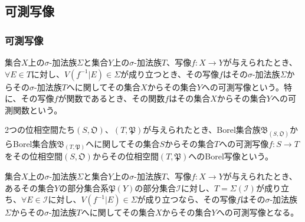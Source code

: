 \documentclass[dvipdfmx]{jsarticle}
\begin{document}
\subsection{可測写像}%
\subsubsection{可測写像}%
\begin{dfn}
集合$X$上の$\sigma$-加法族$\varSigma$と集合$Y$上の$\sigma$-加法族$T$、写像$f:X \rightarrow Y$が与えられたとき、$\forall E \in T$に対し、$V\left( f^{- 1}|E \right) \in \varSigma$が成り立つとき、その写像$f$はその$\sigma$-加法族$\varSigma$からその$\sigma$-加法族$T$へに関してその集合$X$からその集合$Y$への可測写像という。特に、その写像$f$が関数であるとき、その関数$f$はその集合$X$からその集合$Y$への可測関数という。
\end{dfn}
\begin{dfn}
2つの位相空間たち$\left( S,\mathfrak{O} \right)$、$\left( T,\mathfrak{P} \right)$が与えられたとき、Borel集合族$\mathfrak{B}_{\left( S,\mathfrak{O} \right)}$からBorel集合族$\mathfrak{B}_{\left( T,\mathfrak{P} \right)}$へに関してその集合$S$からその集合$T$への可測写像$f:S \rightarrow T$をその位相空間$\left( S,\mathfrak{O} \right)$からその位相空間$\left( T,\mathfrak{P} \right)$へのBorel写像という。
\end{dfn}
\begin{thm}\label{4.5.5.1}
集合$X$上の$\sigma$-加法族$\varSigma$と集合$Y$上の$\sigma$-加法族$T$、写像$f:X \rightarrow Y$が与えられたとき、あるその集合$Y$の部分集合系$\mathfrak{P}(Y)$の部分集合$\mathcal{I}$に対し、$T = \varSigma\left( \mathcal{I} \right)$が成り立ち、$\forall E\in \mathcal{I}$に対し、$V\left( f^{- 1}|E \right) \in \varSigma$が成り立つなら、その写像$f$はその$\sigma$-加法族$\varSigma$からその$\sigma$-加法族$T$へに関してその集合$X$からその集合$Y$への可測写像となる。
\end{thm}
\end{document}
